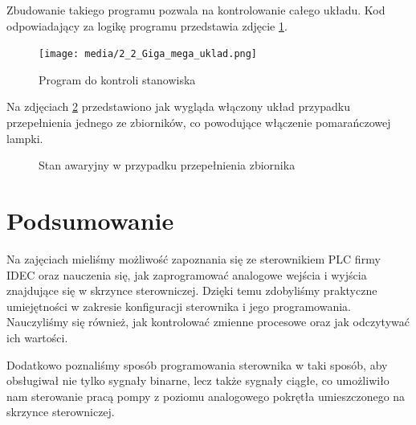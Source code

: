 \documentclass{article}
\begin{document}
Zbudowanie takiego programu pozwala na kontrolowanie całego układu. Kod odpowiadający za logikę programu przedstawia zdjęcie \ref{fig:zdj11}.

\begin{figure}[H]
    \centering
    \texttt{[image: media/2\_2\_Giga\_mega\_uklad.png]}
    \caption{Program do kontroli stanowiska}
    \label{fig:zdj11}
\end{figure}

Na zdjęciach \ref{fig:main2} przedstawiono jak wygląda włączony układ  przypadku przepełnienia jednego ze zbiorników, co powodujące włączenie pomarańczowej lampki. 

\begin{figure}[H]
    \centering
    \caption{Stan awaryjny w przypadku przepełnienia zbiornika}
    \label{fig:main2}
\end{figure}

\newpage
\section{Podsumowanie}

Na zajęciach mieliśmy możliwość zapoznania się ze sterownikiem PLC firmy IDEC oraz nauczenia się, jak zaprogramować analogowe wejścia i wyjścia znajdujące się w skrzynce sterowniczej. Dzięki temu zdobyliśmy praktyczne umiejętności w zakresie konfiguracji sterownika i jego programowania. Nauczyliśmy się również, jak kontrolować zmienne procesowe oraz jak odczytywać ich wartości.

Dodatkowo poznaliśmy sposób programowania sterownika w taki sposób, aby obsługiwał nie tylko sygnały binarne, lecz także sygnały ciągłe, co umożliwiło nam sterowanie pracą pompy z poziomu analogowego pokrętła umieszczonego na skrzynce sterowniczej.
\end{document}

